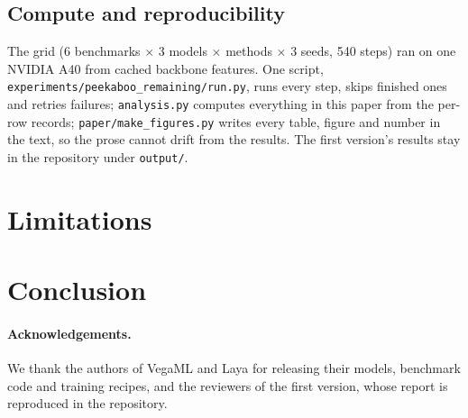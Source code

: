 \documentclass[11pt]{article}
\begin{document}
\subsection{Compute and reproducibility}
The grid (6 benchmarks $\times$ 3 models $\times$ methods $\times$ 3 seeds, 540 steps) ran on one NVIDIA A40 from cached backbone features. One script, \texttt{experiments/peekaboo\_remaining/run.py}, runs every step, skips finished ones and retries failures; \texttt{analysis.py} computes everything in this paper from the per-row records; \texttt{paper/make\_figures.py} writes every table, figure and number in the text, so the prose cannot drift from the results. The first version's results stay in the repository under \texttt{output/}.



\section{Limitations}
\label{sec:limitations}


\section{Conclusion}


\paragraph{Acknowledgements.}
We thank the authors of VegaML and Laya for releasing their models, benchmark code and training recipes, and the reviewers of the first version, whose report is reproduced in the repository.

\FloatBarrier



\appendix

\end{document}
